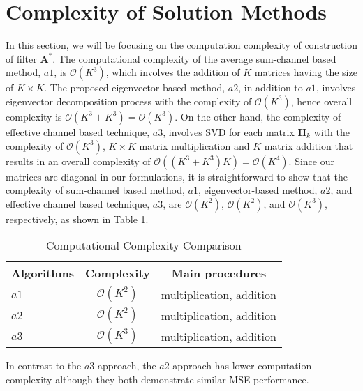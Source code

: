 \documentclass[journal]{IEEEtran}
\theoremstyle{definition}
\begin{document}
\vspace{-0.5cm}
\section{Complexity of Solution Methods}
    In this section, we will be focusing on the computation complexity of construction of filter $\mathbf{A}^*$.    The computational complexity of the average sum-channel based method, $a1$, is $\mathcal{O}(K^3)$, which involves the addition of $K$ matrices having the size of $K \times K$. The proposed eigenvector-based method, $a2$, in addition to $a1$, involves eigenvector decomposition process with the complexity of $\mathcal{O}(K^3)$, hence overall complexity is $\mathcal{O}(K^3+K^3) = \mathcal{O}(K^3)$. On the other hand, the complexity of effective channel based technique, $a3$, involves SVD for each matrix $\mathbf{H}_k$ with the complexity of $\mathcal{O}(K^3)$, $K \times K$ matrix multiplication and $K$ matrix addition that results in an overall complexity of $\mathcal{O}((K^3 + K^3)K) = \mathcal{O}(K^4)$. Since our matrices are diagonal in our formulations, it is straightforward to show that the complexity of sum-channel based method, $a1$, eigenvector-based method, $a2$, and effective channel based technique, $a3$, are $\mathcal{O}(K^2)$, $\mathcal{O}(K^2)$, and $\mathcal{O}(K^3)$, respectively, as shown in Table \ref{table:complexity}. 
		\vspace{-0.1cm}
		\begin{table}[tb]
	\caption{Computational Complexity Comparison}
	\centering %
	\begin{tabular}{l c c } %
		\hline\hline \rule{0pt}{3ex}  %
		\bf{Algorithms} & \bf{Complexity} & \bf{Main procedures}  \\ [0.5ex]
		\hline \rule{0pt}{3ex}  %
		$a1$& $\mathcal{O}(K^2)$ & multiplication, addition  \\[0.2ex]
		\:\:$a2$ &$\mathcal{O}(K^{2})$ & multiplication, addition   \\[0.2ex]
		\:\:$a3$ &$\mathcal{O}(K^3)$ & multiplication, addition   \\[0.2ex]
		\hline %
	\end{tabular}
	\label{table:complexity}
\end{table}

    In contrast to the $a3$ approach, the $a2$ approach has lower computation complexity although they both demonstrate similar MSE performance.
    \vspace{-0.0cm}
\end{document}
